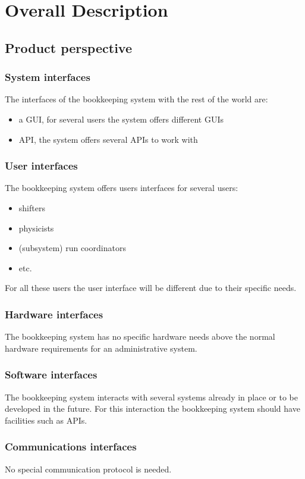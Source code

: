 \chapter{Overall Description}
\section{Product perspective}

\subsection{System interfaces}
The interfaces of the bookkeeping system with the rest of the world are:
\begin{itemize}
  \item a GUI, for several users the system offers different GUIs
  \item API, the system offers several APIs to work with
\end{itemize}
\subsection{User interfaces}
The bookkeeping system offers users interfaces for several users:
\begin{itemize}
  \item shifters
  \item physicists
  \item (subsystem) run coordinators
  \item etc.
\end{itemize}
For all these users the user interface will be different due to their specific needs.

\subsection{Hardware interfaces}
The bookkeeping system has no specific hardware needs above the normal hardware requirements for an administrative system.

\subsection{Software interfaces}
The bookkeeping system interacts with several systems already in place or to be developed in the future. For this interaction the bookkeeping system should have facilities such as APIs.

\subsection{Communications interfaces}
No special communication protocol is needed.


